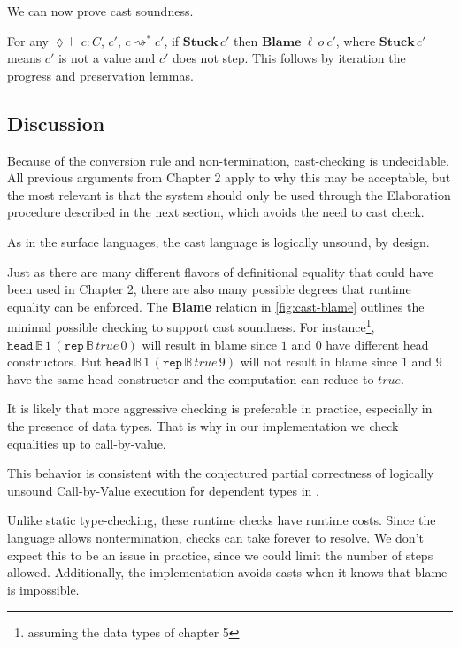 
We can now prove cast soundness.

For any $\lozenge\vdash c:C$, $c'$, $c\rightsquigarrow^{*}c'$,
if $\textbf{Stuck}\,c'$ then $\textbf{Blame}\:\ensuremath{\ell}\,o\:c'$,
where $\textbf{Stuck}\,c'$ means $c'$ is not a value and $c'$ does
not step. This follows by iteration the progress and preservation
lemmas.

\subsection{Discussion}



Because of the conversion rule and non-termination, cast-checking
is undecidable. All previous arguments from Chapter 2 apply to why
this may be acceptable, but the most relevant is that the system should
only be used through the Elaboration procedure described in the next
section, which avoids the need to cast check.


As in the surface languages, the cast language is logically unsound,
by design.

Just as there are many different flavors of definitional equality
that could have been used in Chapter 2, there are also many possible
degrees that runtime equality can be enforced. The \textbf{Blame}
relation in \ref{fig:cast-blame} outlines the minimal possible checking
to support cast soundness. For instance\footnote{assuming the data types of chapter 5},
$\mathtt{head}\,\mathbb{B}\,1\,\left(\mathtt{rep}\,\mathbb{B}\,true\,0\right)$
will result in blame since $1$ and $0$ have different head constructors.
But $\mathtt{head}\,\mathbb{B}\,1\,\left(\mathtt{rep}\,\mathbb{B}\,true\,9\right)$
will not result in blame since $1$ and $9$ have the same head constructor
and the computation can reduce to $true$. 

It is likely that more aggressive checking is preferable in practice,
especially in the presence of data types. That is why in our implementation
we check equalities up to call-by-value. 

This behavior is consistent with the conjectured partial correctness
of logically unsound Call-by-Value execution for dependent types in
\cite{jia2010dependent}. 


Unlike static type-checking, these runtime checks have runtime costs.
Since the language allows nontermination, checks can take forever
to resolve. We don't expect this to be an issue in practice, since
we could limit the number of steps allowed. Additionally, the implementation
avoids casts when it knows that blame is impossible. 